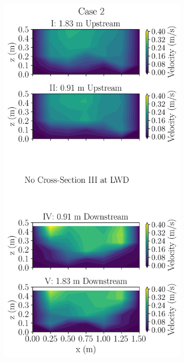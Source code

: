 \documentclass[preview, border=2pt]{standalone}
\begin{document}
\begin{figure}
     \centering
     \begin{subfigure}[b]{0.24\textwidth}
         \centering         
         \caption{}
         \includegraphics[width=\textwidth]{Case2_velocity_contours.png}         

\end{subfigure}
\end{figure}
\end{document}
